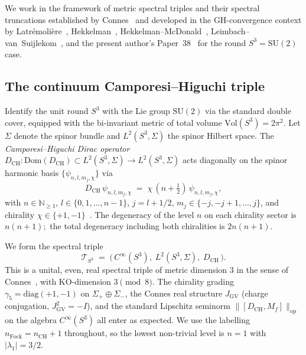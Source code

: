 \documentclass[11pt,a4paper]{article}
\theoremstyle{plain}
\theoremstyle{definition}
\newcommand{\sthree}{S^{3}}
\newcommand{\Tcal}{\mathcal{T}}
\newcommand{\opnorm}[1]{\lVert #1 \rVert_{\mathrm{op}}}
\newcommand{\N}{\mathbb{N}}
\newcommand{\SU}{\mathrm{SU}}
\newcommand{\Vol}{\mathrm{Vol}}
\newcommand{\Mat}{M}
\newcommand{\DCH}{D_{\mathrm{CH}}}
\begin{document}
We work in the framework of metric spectral triples and their
spectral truncations established by
Connes~\cite{connes1995, connes_vs2021} and developed in the
GH-convergence context by
Latr\'emoli\`ere~\cite{latremoliere2018, latremoliere_metric_st_2017},
Hekkelman~\cite{hekkelman2022}, Hekkelman--McDonald~\cite{hekkelman_mcdonald2024},
Leimbach--van~Suijlekom~\cite{leimbach_vs2024}, and the present
author's Paper~38~\cite{paper38} for the round $\sthree = \SU(2)$
case.

\subsection{The continuum Camporesi--Higuchi triple}
\label{sec:ch_triple_recap}

Identify the unit round $\sthree$ with the Lie group $\SU(2)$ via
the standard double cover, equipped with the bi-invariant metric of
total volume $\Vol(\sthree) = 2\pi^2$. Let $\Sigma$ denote the spinor
bundle and $L^2(\sthree, \Sigma)$ the spinor Hilbert space. The
\emph{Camporesi--Higuchi Dirac operator}
$\DCH: \mathrm{Dom}(\DCH) \subset L^2(\sthree, \Sigma) \to L^2(\sthree,
\Sigma)$ acts diagonally on the spinor harmonic basis
$\{\psi_{n, l, m_j, \chi}\}$ via
\begin{equation}\label{eq:CH_spectrum}
   \DCH \, \psi_{n, l, m_j, \chi}
   \;=\; \chi\,(n + \tfrac{1}{2})\, \psi_{n, l, m_j, \chi},
\end{equation}
with $n \in \N_{\ge 1}$, $l \in \{0, 1, \ldots, n-1\}$,
$j = l + 1/2$, $m_j \in \{-j, -j+1, \ldots, j\}$, and chirality
$\chi \in \{+1, -1\}$~\cite{camporesi_higuchi1996}. The degeneracy of
the level $n$ on each chirality sector is $n(n+1)$;\ the total
degeneracy including both chiralities is $2n(n+1)$.

We form the spectral triple
\begin{equation}\label{eq:T_S3}
   \Tcal_{\sthree}
   \;=\; \bigl(\, C^\infty(\sthree),\;
                 L^2(\sthree, \Sigma),\;
                 \DCH \,\bigr).
\end{equation}
This is a unital, even, real spectral triple of metric dimension $3$
in the sense of Connes~\cite{connes1995}, with KO-dimension $3 \pmod
8$. The chirality grading $\gamma_5 = \mathrm{diag}(+1, -1)$ on
$\Sigma_+ \oplus \Sigma_-$, the Connes real structure
$J_{\mathrm{GV}}$ (charge conjugation, $J_{\mathrm{GV}}^2 = -I$), and
the standard Lipschitz seminorm
$\opnorm{[\DCH, \Mat_f]}$ on the algebra $C^\infty(\sthree)$ all enter
as expected. We use the labelling $n_{\mathrm{Fock}} = n_{\mathrm{CH}}
+ 1$ throughout, so the lowest non-trivial level is $n = 1$ with
$|\lambda_1| = 3/2$.
\end{document}

